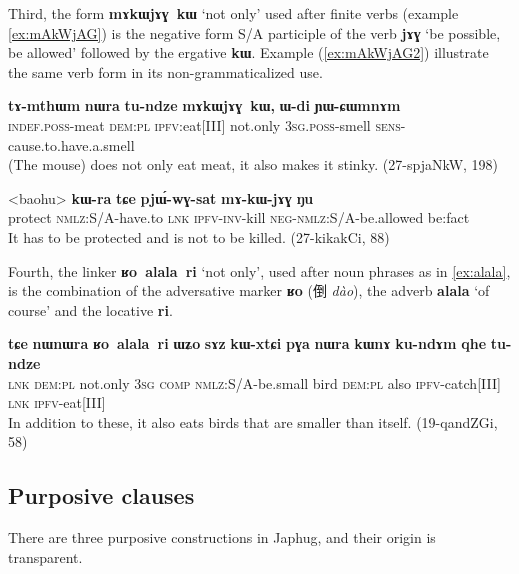 \documentclass[oldfontcommands,oneside,a4paper,11pt]{article}
\newcommand{\ipa}[1]{\mbox{\phon\textbf{#1}}} %
\newcommand{\zh}[1]{{\cn #1}}
\begin{document}
Third, the form \ipa{mɤkɯjɤɣ kɯ} `not only' used after finite verbs (example \ref{ex:mAkWjAG}) is the negative form S/A participle of the verb \ipa{jɤɣ} `be possible, be allowed' followed by the ergative \ipa{kɯ}. Example (\ref{ex:mAkWjAG2}) illustrate the same verb form in its non-grammaticalized use.

 \begin{exe}
\ex \label{ex:mAkWjAG}
\gll  \ipa{tɤ-mthɯm} 	\ipa{nɯra} 	\ipa{tu-ndze} 	\ipa{mɤkɯjɤɣ kɯ,} 	\ipa{ɯ-di} 	\ipa{ɲɯ-ɕɯmnɤm}  \\
\textsc{indef.poss}-meat \textsc{dem:pl} \textsc{ipfv}:eat[III] not.only \textsc{3sg.poss}-smell \textsc{sens}-cause.to.have.a.smell \\
\glt  (The mouse) does not only eat meat, it also makes it stinky. (27-spjaNkW, 198)
\end{exe}


 \begin{exe}
\ex \label{ex:mAkWjAG2}
\gll
<baohu> 	\ipa{kɯ-ra} 	\ipa{tɕe} 	\ipa{pjɯ́-wɣ-sat} 	\ipa{mɤ-kɯ-jɤɣ} \ipa{ŋu} \\
protect \textsc{nmlz}:S/A-have.to \textsc{lnk} \textsc{ipfv-inv}-kill \textsc{neg-nmlz}:S/A-be.allowed be:fact \\ 
\glt It has to be protected and is not to be killed. (27-kikakCi, 88)
\end{exe}

Fourth, the linker \ipa{ʁo alala ri} `not only', used after noun phrases as in \ref{ex:alala}, is the combination of the adversative marker \ipa{ʁo} (\zh{倒}  \textit{dào}), the adverb \ipa{alala} `of course' and the locative \ipa{ri}.

 \begin{exe}
\ex \label{ex:alala}
\gll  \ipa{tɕe} 	\ipa{nɯnɯra} 	\ipa{ʁo alala ri} 	\ipa{ɯʑo} 	\ipa{sɤz} 	\ipa{kɯ-xtɕi} 	\ipa{pɣa} 	\ipa{nɯra} 	\ipa{kɯnɤ} 	\ipa{ku-ndɤm} 	\ipa{qhe} 	\ipa{tu-ndze} \\
\textsc{lnk} \textsc{dem:pl} not.only \textsc{3sg} \textsc{comp} \textsc{nmlz}:S/A-be.small bird \textsc{dem:pl} also \textsc{ipfv}-catch[III] \textsc{lnk} \textsc{ipfv}-eat[III] \\
\glt In addition to these, it also eats birds that are smaller than itself. (19-qandZGi, 58)
\end{exe}

 \subsection{Purposive clauses}
There are three purposive constructions in Japhug, and their origin is transparent.
\end{document}
